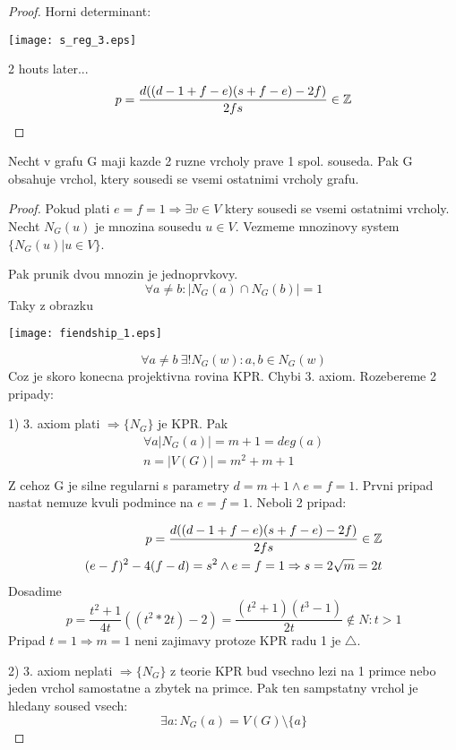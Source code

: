 \begin{proof}
	Horni determinant:

	\texttt{[image: s\_reg\_3.eps]}

	2 houts later...
	\[ p = \frac{d((d - 1 + f - e)(s + f - e) - 2f)}{2fs} \in \operatorname{\mathbb{Z}} \]
\end{proof}

\begin{theorem}
	Necht v grafu G maji kazde 2 ruzne vrcholy prave 1 spol. souseda.
	Pak G obsahuje vrchol, ktery sousedi se vsemi ostatnimi vrcholy grafu.
\end{theorem}
\begin{proof}
	Pokud plati $ e = f = 1 \Rightarrow \exists v \in V$ ktery sousedi se vsemi ostatnimi vrcholy. \\
	Necht $N_G(u)$ je mnozina sousedu $u \in V$. Vezmeme mnozinovy system $\{ N_G(u) | u \in V \}$.

	Pak prunik dvou mnozin je jednoprvkovy.
	\[ \forall a \ne b: |N_G(a) \cap N_G(b)| = 1 \]
	Taky z obrazku

	\texttt{[image: fiendship\_1.eps]}

	\[ \forall a \ne b\ \exists! N_G(w): a,b \in N_G(w) \]
	Coz je skoro konecna projektivna rovina KPR. Chybi 3. axiom. Rozebereme 2 pripady:

	1) 3. axiom plati $\Rightarrow \{N_G\}$ je KPR. Pak
	\begin{equation*}
	\begin{split}
		\forall a |N_G(a)| = m + 1 = deg(a) \\
		n = |V(G)| = m^2 + m + 1\\
	\end{split}
	\end{equation*}
	Z cehoz G je silne regularni s parametry $ d = m + 1 \land e = f = 1$. Prvni pripad nastat nemuze kvuli podmince na $e = f = 1$. Neboli 2 pripad:

	\begin{equation*}
	\begin{aligned}
		p = \frac{d((d - 1 + f - e)(s + f - e) - 2f)}{2fs} \in \operatorname{\mathbb{Z}} \\
		(e - f)^2 - 4 (f - d) = s^2 \land e = f = 1 \Rightarrow s = 2 \sqrt{m} = 2t
	\end{aligned}
	\end{equation*}
	Dosadime
	\[ p = \frac{t^2 + 1}{4t}((t^2 * 2t) - 2) = \frac{(t^2 + 1)(t^3 - 1)}{2t} \notin N : t > 1 \]
	Pripad $t = 1 \Rightarrow m = 1$ neni zajimavy protoze KPR radu 1 je $\triangle$.

	2) 3. axiom neplati $\Rightarrow \{N_G\}$ z teorie KPR bud vsechno lezi na 1 primce nebo jeden vrchol samostatne a zbytek na primce. Pak ten sampstatny vrchol je hledany soused vsech:
	\[ \exists a : N_G(a) = V(G)\setminus \{a\} \]

\end{proof}
